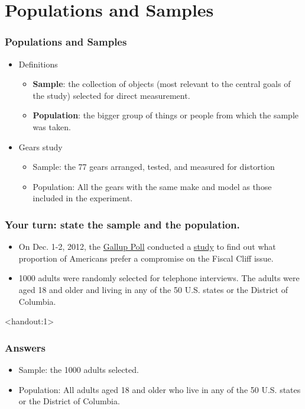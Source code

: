 \documentclass[handout]{beamer}\usepackage{graphicx, color}
\newcommand{\answers}{1}
\numberwithin{equation}{section}
\begin{document}
\section{Populations and Samples}

\begin{frame}
\frametitle{Populations and Samples}
\begin{itemize}
\item Definitions
\begin{itemize}
\item {\bf Sample}: the collection of objects (most relevant to the central goals of the study) selected for direct measurement.  
\pause \item {\bf Population}: the bigger group of things or people from which the sample was taken. 
\end{itemize}
\pause \item Gears study
\begin{itemize}
\item Sample: the 77 gears arranged, tested, and measured for distortion
\pause \item Population: All the gears with the same make and model as those included in the experiment.
\end{itemize}
\end{itemize}
\end{frame}

\begin{frame}
\frametitle{Your turn: state the sample and the population.} \small
\begin{itemize}
\item On Dec. 1-2, 2012, the \href{http://www.gallup.com/}{Gallup Poll} conducted a \href{http://www.gallup.com/poll/159065/americans-widely-prefer-compromise-fiscal-cliff.aspx}{study} to find out what proportion of Americans prefer a compromise on the Fiscal Cliff issue. 
\pause \item 1000 adults were randomly selected for telephone interviews. The adults were aged 18 and older and living in any of the 50 U.S. states or the District of Columbia.
\end{itemize}
\end{frame}

\begin{frame}<handout:\answers>
\frametitle{Answers}
\begin{itemize}
\item Sample: the 1000 adults selected.
\pause \item Population: All adults aged 18 and older who live in any of the 50 U.S. states or the District of Columbia.
\end{itemize}
\end{frame}
\end{document}
